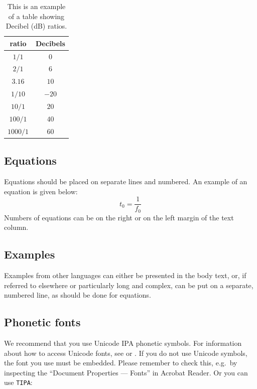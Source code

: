 \documentclass[
  a4paper,
  11pt,
  twocolumn]{article}
\begin{document}
\begin{table}[!ht]
  \caption{This is an example of a table showing Decibel (dB) ratios.}
  \label{tab:decibel}
  \begin{center}
  \begin{tabular}{|c|c|}
  \hline
  \rowcolor[gray]{.75}
  ratio    & Decibels \\
  \hline
  $1/1$    & $0$      \\
  $2/1$    & $6$      \\
  $3.16$   & $10$     \\
  $1/10$   & $-20$    \\
  $10/1$   & $20$     \\
  $100/1$  & $40$     \\
  $1000/1$ & $60$     \\
  \hline
  \end{tabular}
  \end{center}
\end{table}

\subsection{Equations}

Equations should be placed on separate lines and numbered. An example of
an equation is given below: \begin{equation}\label{eq:tzero}
  t_0 = \frac{1}{f_0}
\end{equation} \noindent Numbers of equations can be on the right or on
the left margin of the text column.

\subsection{Examples}

Examples from other languages can either be presented in the body text,
or, if referred to elsewhere or particularly long and complex, can be
put on a separate, numbered line, as should be done for equations.

\subsection{Phonetic fonts}

We recommend that you use Unicode IPA phonetic symbols. For information
about how to access Unicode fonts, see \cite{IPA-SIL} or
\cite{IPA-KEYBOARD}. If you do not use Unicode symbols, the font you use
must be embedded. Please remember to check this, e.g.~by inspecting the
``Document Properties --- Fonts'' in Acrobat Reader. Or you can use
\texttt{TIPA}: 
\end{document}
